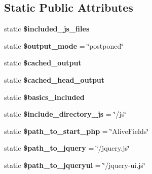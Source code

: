\subsection*{\-Static \-Public \-Attributes}
\begin{DoxyCompactItemize}
\item 
\hypertarget{class_ac_field_a2939c156215e71844df0b4bd295adb02}{static {\bfseries \$included\-\_\-js\-\_\-files}}\label{class_ac_field_a2939c156215e71844df0b4bd295adb02}

\item 
\hypertarget{class_ac_field_a66939be2acf75e7e658c54938304e46c}{static {\bfseries \$output\-\_\-mode} = \char`\"{}postponed\char`\"{}}\label{class_ac_field_a66939be2acf75e7e658c54938304e46c}

\item 
\hypertarget{class_ac_field_ac8b255d1f0c375ebab297b23e12d894d}{static {\bfseries \$cached\-\_\-output}}\label{class_ac_field_ac8b255d1f0c375ebab297b23e12d894d}

\item 
\hypertarget{class_ac_field_aedde9fe97834cc4af51c0883b75176b3}{static {\bfseries \$cached\-\_\-head\-\_\-output}}\label{class_ac_field_aedde9fe97834cc4af51c0883b75176b3}

\item 
\hypertarget{class_ac_field_ad8fcb439677ac5c2360e5de4c82fc7d9}{static {\bfseries \$basics\-\_\-included}}\label{class_ac_field_ad8fcb439677ac5c2360e5de4c82fc7d9}

\item 
\hypertarget{class_ac_field_af855edb7a29a9a6795e4cc07b3aabde5}{static {\bfseries \$include\-\_\-directory\-\_\-js} = \char`\"{}/js\char`\"{}}\label{class_ac_field_af855edb7a29a9a6795e4cc07b3aabde5}

\item 
\hypertarget{class_ac_field_a634347ee0a471c66f3cd8fa59bb03b76}{static {\bfseries \$path\-\_\-to\-\_\-start\-\_\-php} = \char`\"{}\-Alive\-Fields\char`\"{}}\label{class_ac_field_a634347ee0a471c66f3cd8fa59bb03b76}

\item 
\hypertarget{class_ac_field_a462ba91640f41b3661d814aa52dfb6d2}{static {\bfseries \$path\-\_\-to\-\_\-jquery} = \char`\"{}/jquery.\-js\char`\"{}}\label{class_ac_field_a462ba91640f41b3661d814aa52dfb6d2}

\item 
\hypertarget{class_ac_field_a13f53b5a9734ed7b776ee9d46d3d9687}{static {\bfseries \$path\-\_\-to\-\_\-jqueryui} = \char`\"{}/jquery-\/ui.\-js\char`\"{}}\label{class_ac_field_a13f53b5a9734ed7b776ee9d46d3d9687}


\end{DoxyCompactItemize}
